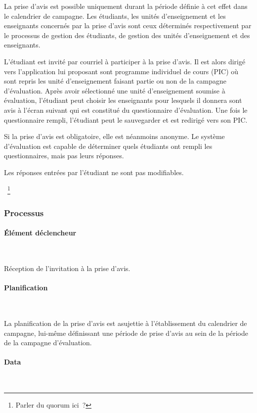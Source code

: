 \documentclass[a4paper,11pt]{report}
\begin{document}
La prise d'avis est possible uniquement durant la période définie à cet effet dans le calendrier de campagne.
Les étudiants, les unités d'enseignement et les enseignants concernés par la prise d'avis sont ceux déterminés respectivement par le processus de gestion des étudiants, de gestion des unités d'enseignement et des enseignants.

L'étudiant est invité par courriel à participer à la prise d'avis.
Il est alors dirigé vers l'application lui proposant sont programme individuel de cours (PIC) où sont repris les unité d'enseignement faisant partie ou non de la campagne d'évaluation.
Après avoir sélectionné une unité d'enseignement soumise à évaluation, l'étudiant peut choisir les enseignants pour lesquels il donnera sont avis à l'écran suivant qui est constitué du questionnaire d'évaluation.
Une fois le questionnaire rempli, l'étudiant peut le sauvegarder et est redirigé vers son PIC.

Si la prise d'avis est obligatoire, elle est néanmoins anonyme. Le système d'évaluation est capable de déterminer quels étudiants ont rempli les questionnaires, mais pas leurs réponses.

Les réponses entrées par l'étudiant ne sont pas modifiables.

~\footnote{Parler du quorum ici~?}

\subsubsection{Processus}
\paragraph{Élément déclencheur}~\newline{}

Réception de l'invitation à la prise d'avis.

\paragraph{Planification}~\newline{}

La planification de la prise d'avis est asujettie à l'établissement du calendrier de campagne, lui-même définissant une période de prise d'avis au sein de la période de la campagne d'évaluation.

\paragraph{Data}~\newline{}
\end{document}
